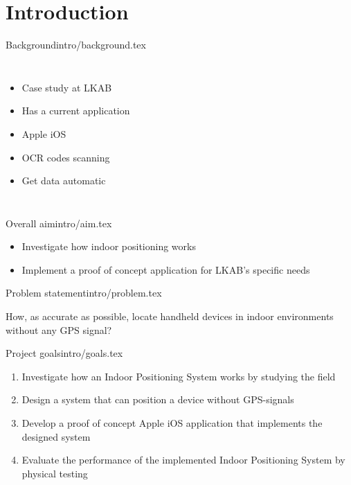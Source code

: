 \section{Introduction}


\begin{notedFrame}{Background}{intro/background.tex}
	\begin{columns}[T, onlytextwidth]
			\begin{itemize}
				\item Case study at LKAB
				\item Has a current application
				\item Apple iOS
				\item OCR codes scanning
				\item Get data automatic
			\end{itemize}

	\end{columns}
\end{notedFrame}

\begin{notedFrame}{Overall aim}{intro/aim.tex}
    \begin{block}{}
    \begin{itemize}
        \item Investigate how indoor positioning works
        \item Implement a proof of concept application for LKAB's specific needs
    \end{itemize}
    \end{block}
\end{notedFrame}


\begin{notedFrame}{Problem statement}{intro/problem.tex}
\begin{exampleblock}{}
    How, as accurate as possible, locate handheld devices in indoor environments without any GPS signal?	
\end{exampleblock}
\end{notedFrame}


\begin{notedFrame}{Project goals}{intro/goals.tex}
	\begin{enumerate}
		\item
		Investigate how an Indoor Positioning System works by studying the field

		\item
		Design a system that can position a device without GPS-signals

		\item
		Develop a proof of concept Apple iOS application that implements the designed system

		\item
		Evaluate the performance of the implemented Indoor Positioning System by physical testing
	\end{enumerate}
\end{notedFrame}

